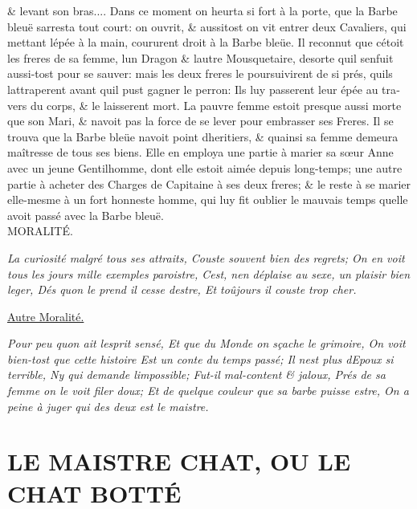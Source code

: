 \documentclass[14pt,a4paper]{memoir}
\newcommand{\ul}[1]{\uline{#1}}
\begin{document}
\begin{otherlanguage}{french}
\& levant son bras.... Dans ce moment on heurta si fort à la porte, que
la Barbe bleuë s\textquotesingle arresta tout court: on ouvrit, \&
aussitost on vit entrer deux Cavaliers, qui mettant
l\textquotesingle épée à la main, coururent droit à la Barbe bleüe. Il
reconnut que c\textquotesingle étoit les freres de sa femme,
l\textquotesingle un Dragon \& l\textquotesingle autre Mousquetaire,
desorte qu\textquotesingle il s\textquotesingle enfuit aussi-tost pour
se sauver: mais les deux freres le poursuivirent de si prés,
qu\textquotesingle ils l\textquotesingle attraperent avant
qu\textquotesingle il pust gagner le perron: Ils luy passerent leur épée
au travers du corps, \& le laisserent mort. La pauvre femme estoit
presque aussi morte que son Mari, \& n\textquotesingle avoit pas la
force de se lever pour embrasser ses Freres. Il se trouva que la Barbe
bleüe n\textquotesingle avoit point d\textquotesingle heritiers, \&
qu\textquotesingle ainsi sa femme demeura maîtresse de tous ses biens.
Elle en employa une partie à marier sa sœur Anne avec un jeune
Gentilhomme, dont elle estoit aimée depuis long-temps; une autre partie
à acheter des Charges de Capitaine à ses deux freres; \& le reste à se
marier elle-mesme à un fort honneste homme, qui luy fit oublier le
mauvais temps qu\textquotesingle elle avoit passé avec la Barbe bleuë. \\

MORALITÉ.

\emph{{La curiosité malgré tous ses attraits,} {Couste souvent bien des
regrets;} {On en voit tous les jours mille exemples paroistre,}
{C\textquotesingle est, n\textquotesingle en déplaise au sexe, un
plaisir bien leger,} {Dés qu\textquotesingle on le prend il cesse
d\textquotesingle estre,} {Et toûjours il couste trop cher.}}

\ul{Autre Moralité.}

\emph{{Pour peu qu\textquotesingle on ait l\textquotesingle esprit
sensé,} {Et que du Monde on sçache le grimoire,} {On voit bien-tost que
cette histoire} {Est un conte du temps passé;} {Il n\textquotesingle est
plus d\textquotesingle Epoux si terrible,} {Ny qui demande
l\textquotesingle impossible;} {Fut-il mal-content \& jaloux,} {Prés de
sa femme on le voit filer doux;} {Et de quelque couleur que sa barbe
puisse estre, } {On a peine à juger qui des deux est le maistre.}}

\section{LE MAISTRE CHAT, OU LE CHAT BOTTÉ}


\end{otherlanguage}
\end{document}
